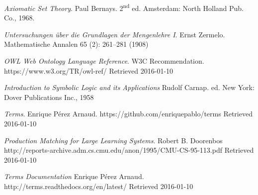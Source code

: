 \documentclass{IOS-Book-Article}     %
\begin{document}
\clearpage
\begin{thebibliography}{99}

\textit{Axiomatic Set Theory}. Paul Bernays.
2\textsuperscript{nd} ed. Amsterdam: North Holland Pub. Co., 1968.

  \textit{Untersuchungen über die Grundlagen der Mengenlehre I}. Ernst Zermelo.
  Mathematische Annalen 65 (2): 261–281 (1908)

  \textit{OWL Web Ontology Language Reference}. W3C Recommendation.
  https://www.w3.org/TR/owl-ref/ Retrieved 2016-01-10

  \textit{Introduction to Symbolic Logic and its Applications} Rudolf Carnap.
  ed. New York: Dover Publications Inc., 1958

  \textit{Terms}. Enrique P\'erez Arnaud.
  https://github.com/enriquepablo/terms Retrieved 2016-01-10

  \textit{Production Matching for Large Learning Systems}. Robert B. Doorenbos
  http://reports-archive.adm.cs.cmu.edu/anon/1995/CMU-CS-95-113.pdf Retrieved 2016-01-10

  \textit{Terms Documentation} Enrique P\'erez Arnaud.
  http://terms.readthedocs.org/en/latest/ Retrieved 2016-01-10


\end{thebibliography}
\end{document}
